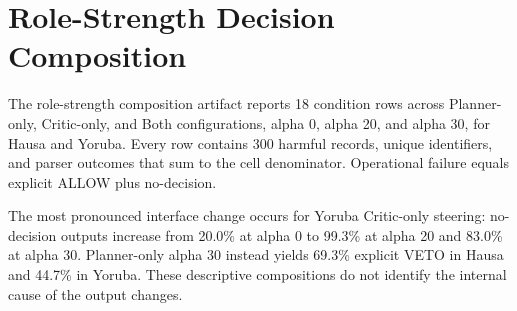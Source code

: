 \section{Role-Strength Decision Composition}
The role-strength composition artifact reports 18 condition rows across Planner-only, Critic-only, and Both configurations, alpha 0, alpha 20, and alpha 30, for Hausa and Yoruba. Every row contains 300 harmful records, unique identifiers, and parser outcomes that sum to the cell denominator. Operational failure equals explicit ALLOW plus no-decision.

The most pronounced interface change occurs for Yoruba Critic-only steering: no-decision outputs increase from 20.0\% at alpha 0 to 99.3\% at alpha 20 and 83.0\% at alpha 30. Planner-only alpha 30 instead yields 69.3\% explicit VETO in Hausa and 44.7\% in Yoruba. These descriptive compositions do not identify the internal cause of the output changes.